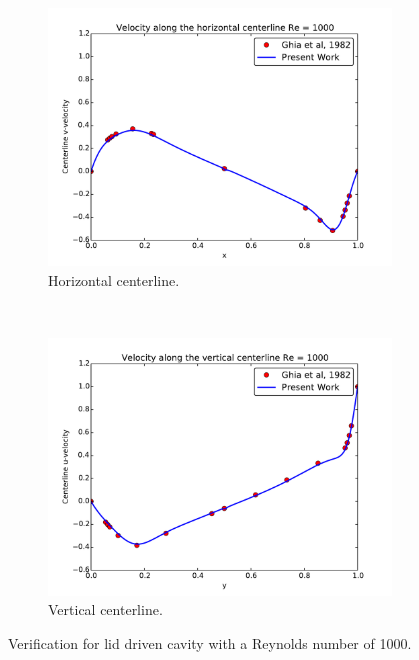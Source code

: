 \documentclass[onehalf,11pt]{beavtex}
\begin{document}
\begin{figure}[htb]
	\centering
	\begin{subfigure}{0.4\textwidth}
		\includegraphics[width=\linewidth]{ldc_horizontal_1000}
		\caption{Horizontal centerline.}		
	\end{subfigure}
	~
	\begin{subfigure}{0.4\textwidth}
		\includegraphics[width=\linewidth]{ldc_vertical_1000}
		\caption{Vertical centerline.}		
	\end{subfigure}
	\caption{Verification for lid driven cavity with a Reynolds number of 1000.}
	\label{fig:ldc1000}
\end{figure}
\end{document}
